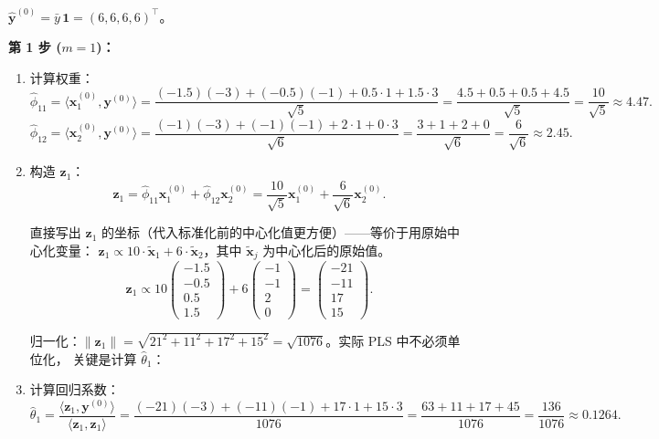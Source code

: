 $\hat{\mathbf{y}}^{(0)} = \bar{y}\,\mathbf{1} = (6,6,6,6)^\top$。

\medskip
\noindent
\textbf{第 1 步 ($m=1$)：}

\begin{enumerate}[label=(\alph*), leftmargin=*]
    \item 计算权重：
    \[
        \hat{\phi}_{11} = \langle \mathbf{x}_1^{(0)}, \mathbf{y}^{(0)} \rangle
        = \frac{(-1.5)(-3) + (-0.5)(-1) + 0.5\cdot 1 + 1.5\cdot 3}{\sqrt{5}}
        = \frac{4.5 + 0.5 + 0.5 + 4.5}{\sqrt{5}} = \frac{10}{\sqrt{5}} \approx 4.47.
    \]
    \[
        \hat{\phi}_{12} = \langle \mathbf{x}_2^{(0)}, \mathbf{y}^{(0)} \rangle
        = \frac{(-1)(-3) + (-1)(-1) + 2\cdot 1 + 0\cdot 3}{\sqrt{6}}
        = \frac{3 + 1 + 2 + 0}{\sqrt{6}} = \frac{6}{\sqrt{6}} \approx 2.45.
    \]
    
    \item 构造 $\mathbf{z}_1$：
    \[
        \mathbf{z}_1 = \hat{\phi}_{11}\mathbf{x}_1^{(0)} + \hat{\phi}_{12}\mathbf{x}_2^{(0)}
        = \frac{10}{\sqrt{5}}\mathbf{x}_1^{(0)} + \frac{6}{\sqrt{6}}\mathbf{x}_2^{(0)}.
    \]
    
    直接写出 $\mathbf{z}_1$ 的坐标（代入标准化前的中心化值更方便）——等价于用原始中心化变量：
    $\mathbf{z}_1 \propto 10\cdot \tilde{\mathbf{x}}_1 + 6\cdot \tilde{\mathbf{x}}_2$，其中 $\tilde{\mathbf{x}}_j$ 为中心化后的原始值。
    \[
        \mathbf{z}_1 \propto 10\!\begin{pmatrix} -1.5 \\ -0.5 \\ 0.5 \\ 1.5 \end{pmatrix}
        + 6\!\begin{pmatrix} -1 \\ -1 \\ 2 \\ 0 \end{pmatrix}
        = \begin{pmatrix} -21 \\ -11 \\ 17 \\ 15 \end{pmatrix}.
    \]
    
    归一化：$\|\mathbf{z}_1\| = \sqrt{21^2 + 11^2 + 17^2 + 15^2} = \sqrt{1076}$。实际 PLS 中不必须单位化，
    关键是计算 $\hat{\theta}_1$：
    
    \item 计算回归系数：
    \[
        \hat{\theta}_1 = \frac{\langle \mathbf{z}_1, \mathbf{y}^{(0)} \rangle}{\langle \mathbf{z}_1, \mathbf{z}_1 \rangle}
        = \frac{(-21)(-3) + (-11)(-1) + 17\cdot 1 + 15\cdot 3}{1076}
        = \frac{63 + 11 + 17 + 45}{1076} = \frac{136}{1076} \approx 0.1264.
    \]
    

\end{enumerate}

